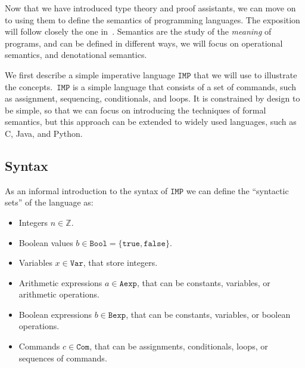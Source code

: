 \documentclass[
  a4paper, 
  10pt, 
  parskip=half, 
  DIV=20,
  toc=bibliography,
  usegeometry,
]{scrartcl}
\begin{document}
Now that we have introduced type theory and proof assistants, we can move on to
using them to define the semantics of programming languages. The exposition
will follow closely the one in~\cite{winskel_formal_semantics}.
Semantics are the
study of the \emph{meaning} of programs, and can be defined in different ways, we
will focus on operational semantics, and denotational semantics.

We first describe a simple imperative language \(\texttt{IMP}\) that we will use
to illustrate the concepts.\ \(\texttt{IMP}\) is a simple language that consists of
a set of commands, such as assignment, sequencing, conditionals, and loops. It
is constrained by design to be simple, so that we can focus on introducing the
techniques of formal semantics, but this approach can be extended to widely used
languages, such as C, Java, and Python.

\subsection{Syntax}

As an informal introduction to the syntax of \(\texttt{IMP}\) we can define the
\enquote{syntactic sets} of the language as:

\begin{itemize}
\item Integers \(n \in \mathbb{Z}\).
\item Boolean values \(b \in \texttt{Bool} = \{\texttt{true}, \texttt{false}\}\).
\item Variables \(x \in \texttt{Var}\), that store integers.
\item Arithmetic expressions \(a \in \texttt{Aexp}\), that can be constants,
  variables, or arithmetic operations.
\item Boolean expressions \(b \in \texttt{Bexp}\), that can be constants, variables,
  or boolean operations.
\item Commands \(c \in \texttt{Com}\), that can be assignments, conditionals, loops,
  or sequences of commands.
\end{itemize}
\end{document}
